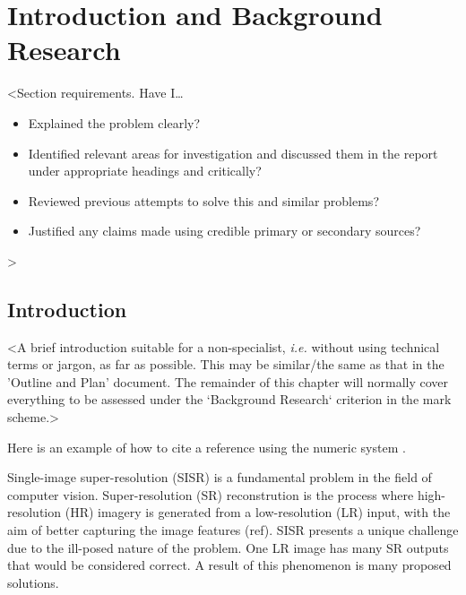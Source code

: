 \chapter{Introduction and Background Research}

\label{chapter1}

<Section requirements. Have I\dots
\begin{itemize}
    \item Explained the problem clearly?
    \item Identified relevant areas for investigation and discussed them in the report under appropriate headings and critically?
    \item Reviewed previous attempts to solve this and similar problems?
    \item Justified any claims made using credible primary or secondary sources?
\end{itemize}
>

\section{Introduction}

<A brief introduction suitable for a non-specialist, {\em i.e.} without using technical terms or jargon, as far as possible. This may be similar/the same as that in the 'Outline and Plan' document. The remainder of this chapter will normally cover everything to be assessed under the `Background Research` criterion in the mark scheme.>

Here is an example of how to cite a reference using the numeric system \cite{parikh1980adaptive}.

Single-image super-resolution (SISR) is a fundamental problem in the field of computer vision. Super-resolution (SR) reconstrution is the process where high-resolution (HR) imagery is generated from a low-resolution (LR) input, with the aim of better capturing the image features (ref). SISR presents a unique challenge due to the ill-posed nature of the problem. One LR image has many SR outputs that would be considered correct. A result of this phenomenon is many proposed solutions. 

